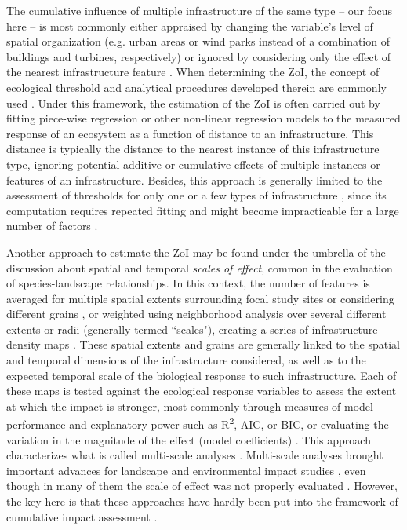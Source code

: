\documentclass[titlepage]{article}
\begin{document}
The cumulative influence of multiple infrastructure of the same type -- our focus here -- is most commonly either appraised by changing the variable's level of spatial organization (e.g. urban areas or wind parks instead of a combination of buildings and turbines, respectively) or ignored by considering only the effect of the nearest infrastructure feature \citep[e.g.][]{torres_assessing_2016}. When determining the ZoI, the concept of ecological threshold \citep{huggett_concept_2005} and analytical procedures developed therein are commonly used \citep{ficetola_ecological_2009}. Under this framework, the estimation of the ZoI is often carried out by fitting piece-wise regression or other non-linear regression models \citep[such as an exponential decay or generalized additive models;][]{skarin_out_2018, ficetola_ecological_2009} to the measured response of an ecosystem as a function of distance to an infrastructure. This distance is typically the distance to the nearest instance of this infrastructure type, ignoring potential additive or cumulative effects of multiple instances or features of an infrastructure. Besides, this approach is generally limited to the assessment of thresholds for only one or a few types of infrastructure \citep[e.g.][]{boulanger_estimating_2012}, since its computation requires repeated fitting and might become impracticable for a large number of factors \citep{lee_estimating_2020}. 

Another approach to estimate the ZoI may be found under the umbrella of the discussion about spatial and temporal \textit{scales of effect}, common in the evaluation of species-landscape relationships. In this context, the number of features is averaged for multiple spatial extents surrounding focal study sites \citep{jackson_are_2015} or considering different grains \citep{laforge_process-focussed_2015}, or weighted using neighborhood analysis over several different extents or radii (generally termed ``scales"), creating a series of infrastructure density maps \citep{mcgarigal_multi-scale_2016}. These spatial extents and grains are generally linked to the spatial and temporal dimensions of the infrastructure considered, as well as to the expected temporal scale of the biological response to such infrastructure. Each of these maps is tested against the ecological response variables to assess the extent at which the impact is stronger, most commonly through measures of model performance and explanatory power such as R\textsuperscript{2}, AIC, or BIC, or evaluating the variation in the magnitude of the effect (model coefficients) \citep{jackson_are_2015, huais_multifit_2018}. This approach characterizes what is called multi-scale analyses \citep[e.g.][]{zeller_multi-level_2017}.
Multi-scale analyses brought important advances for landscape and environmental impact studies \citep[e.g.][]{mcgarigal_multi-scale_2016}, even though in many of them the scale of effect was not properly evaluated \citep{jackson_are_2015}. However, the key here is that these approaches have hardly been put into the framework of cumulative impact assessment \citep[but see][]{polfus_identifying_2011}.
\end{document}
